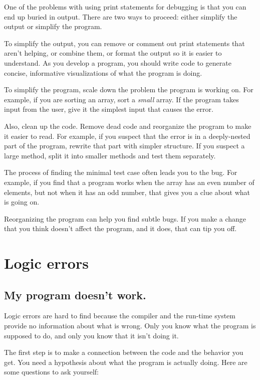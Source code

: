 \documentclass[12pt]{book}
\theoremstyle{exercise}
\begin{document}
One of the problems with using print statements for debugging
is that you can end up buried in output.  There are two ways
to proceed: either simplify the output or simplify the program.

To simplify the output, you can remove or comment out print
statements that aren't helping, or combine them, or format
the output so it is easier to understand.  As you develop a program,
you should write code to generate concise,
informative visualizations of what the program is doing.

To simplify the program,
scale down the problem the program is working on.  For example, if you
are sorting an array, sort a {\em small} array.  If the program takes
input from the user, give it the simplest input that causes the
error.

Also, clean up the code.  Remove dead code and reorganize the
program to make it easier to read.  For example, if you
suspect that the error is in a deeply-nested part of the program,
rewrite that part with simpler structure.  If you suspect a
large method, split it into smaller methods and test them
separately.

The process of finding the minimal test case often leads you to the
bug.  For example, if you find that a program works when the array has
an even number of elements, but not when it has an odd number, that
gives you a clue about what is going on.

Reorganizing the program can help you find subtle
bugs.  If you make a change that you think doesn't affect the
program, and it does, that can tip you off.


\section{Logic errors}

\subsection*{My program doesn't work.}

Logic errors are hard to find because the
compiler and the run-time system provide no information about
what is wrong.  Only you know what the program is supposed to
do, and only you know that it isn't doing it.

The first step is to make a connection between the code and the
behavior you get.  You need a hypothesis about what the program
is actually doing.
%
Here are some questions to ask yourself:
\end{document}
